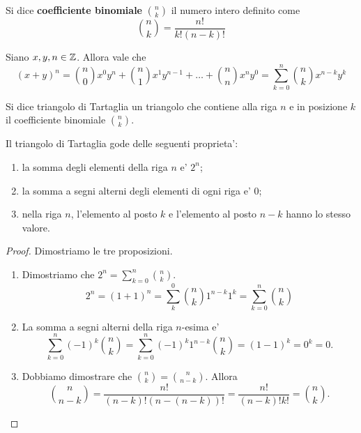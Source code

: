 \begin{definition}
    Si dice \textbf{coefficiente binomiale} $\binom{n}{k}$ il numero intero definito come \begin{equation}
        \binom{n}{k} = \frac{n!}{k!(n-k)!}
    \end{equation}    
\end{definition}

\begin{theorem} \label{binomiale}
    Siano $x, y, n \in \mathbb{Z}$. Allora vale che
    \begin{equation}
        (x+y)^n = \binom{n}{0}x^0y^n + \binom{n}{1}x^1y^{n-1} + \dots + \binom{n}{n}x^ny^0 = \sum_{k=0}^n \binom{n}{k}x^{n-k}y^k
    \end{equation}
\end{theorem}

\begin{definition}
    Si dice triangolo di Tartaglia un triangolo che contiene alla riga $n$ e in posizione $k$ il coefficiente binomiale $\binom{n}{k}$.
\end{definition}

\begin{proposition}
    Il triangolo di Tartaglia gode delle seguenti proprieta':
    \begin{enumerate}
        \item la somma degli elementi della riga $n$ e' $2^n$;
        \item la somma a segni alterni degli elementi di ogni riga e' $0$;
        \item nella riga $n$, l'elemento al posto $k$ e l'elemento al posto $n-k$ hanno lo stesso valore.
    \end{enumerate}
\end{proposition}
\begin{proof}
    Dimostriamo le tre proposizioni.
    \begin{enumerate}
        \item Dimostriamo che $2^n = \sum_{k=0}^n \binom{n}{k}$.
        \[2^n = (1+1)^n = \sum_k^0 \binom{n}{k}1^{n-k}1^k = \sum_{k=0}^n \binom{n}{k}\]
        \item La somma a segni alterni della riga $n$-esima e' \[\sum_{k=0}^n (-1)^k\binom{n}{k} = \sum_{k=0}^n (-1)^k1^{n-k}\binom{n}{k} = (1-1)^k = 0^k = 0.\]
        \item Dobbiamo dimostrare che $\binom{n}{k} = \binom{n}{n-k}$. Allora
        \[\binom{n}{n-k} = \frac{n!}{(n-k)!(n-(n-k))!} = \frac{n!}{(n-k)!k!} = \binom{n}{k}.\]
    \end{enumerate}
\end{proof}

